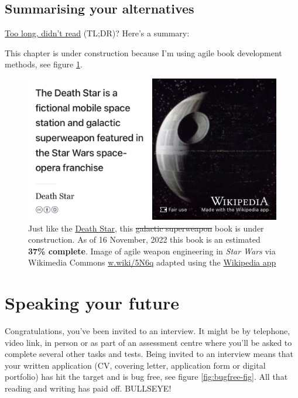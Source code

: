 \documentclass[
]{book}
\begin{document}
\hypertarget{tldr11}{%
\section{Summarising your alternatives}\label{tldr11}}

\href{https://en.wiktionary.org/wiki/too_long;_didn\%27t_read}{Too long, didn't read} (TL;DR)? Here's a summary:

This chapter is under construction because I'm using agile book development methods, see figure \ref{fig:deathstar8-fig}.

\begin{figure}

{\centering \includegraphics[width=0.99\linewidth]{images/DeathStar2} 

}

\caption{Just like the \href{https://en.wikipedia.org/wiki/Death_Star}{Death Star}, this \sout{galactic superweapon} book is under construction. As of 16 November, 2022 this book is an estimated \textbf{37\% complete}. Image of agile weapon engineering in \emph{Star Wars} via Wikimedia Commons \href{https://w.wiki/5N6q}{w.wiki/5N6q} adapted using the \href{https://apps.apple.com/gb/app/wikipedia/id324715238}{Wikipedia app}}\label{fig:deathstar8-fig}
\end{figure}

\hypertarget{speaking}{%
\chapter{Speaking your future}\label{speaking}}

Congratulations, you've been invited to an interview. It might be by telephone, video link, in person or as part of an assessment centre where you'll be asked to complete several other tasks and tests. Being invited to an interview means that your written application (CV, covering letter, application form or digital portfolio) has hit the target and is bug free, see figure \ref{fig:bugfree-fig}. All that reading and writing has paid off. BULLSEYE! 🎯
\end{document}
